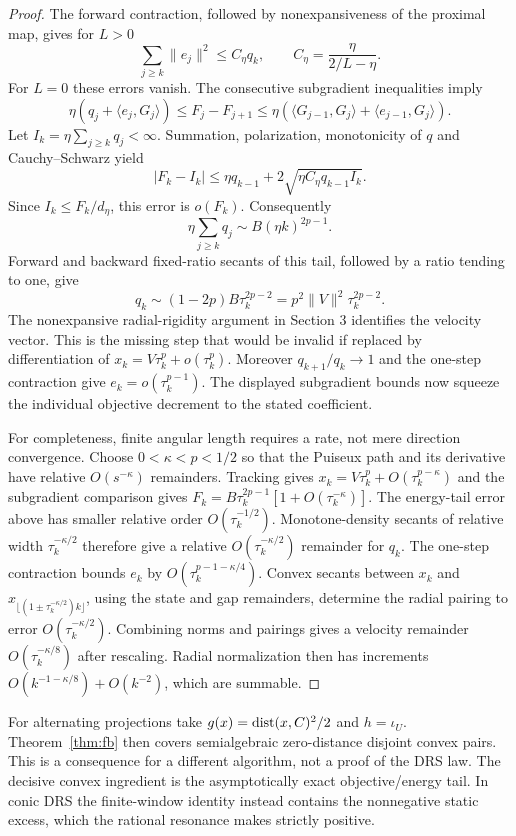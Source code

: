 \documentclass[11pt]{article}
\theoremstyle{remark}\newtheorem{remark}[theorem]{Remark}
\newcommand{\ip}[2]{\langle #1,#2\rangle}\newcommand{\norm}[1]{\lVert #1\rVert}
\numberwithin{equation}{section}
\begin{document}
\begin{proof}
The forward contraction, followed by nonexpansiveness of the proximal map, gives for $L>0$
\[
 \sum_{j\geq k}\norm{e_j}^2\leq C_\eta q_k,
 \qquad C_\eta=\frac{\eta}{2/L-\eta}.
\]
For $L=0$ these errors vanish. The consecutive subgradient inequalities imply
\[
 \eta(q_j+\ip{e_j}{G_j})\leq F_j-F_{j+1}
 \leq\eta(\ip{G_{j-1}}{G_j}+\ip{e_{j-1}}{G_j}).
\]
Let $I_k=\eta\sum_{j\geq k}q_j<\infty$. Summation, polarization, monotonicity of $q$ and Cauchy--Schwarz yield
\[
 |F_k-I_k|\leq\eta q_{k-1}+2\sqrt{\eta C_\eta q_{k-1}I_k}.
\]
Since $I_k\leq F_k/d_\eta$, this error is $o(F_k)$. Consequently
\[
 \eta\sum_{j\geq k}q_j\sim B(\eta k)^{2p-1}.
\]
Forward and backward fixed-ratio secants of this tail, followed by a ratio tending to one, give
\[
 q_k\sim (1-2p)B\tau_k^{2p-2}=p^2\norm V^2\tau_k^{2p-2}.
\]
The nonexpansive radial-rigidity argument in Section 3 identifies the velocity vector. This is the missing step that would be invalid if replaced by differentiation of $x_k=V\tau_k^p+o(\tau_k^p)$. Moreover $q_{k+1}/q_k\to1$ and the one-step contraction give $e_k=o(\tau_k^{p-1})$. The displayed subgradient bounds now squeeze the individual objective decrement to the stated coefficient.

For completeness, finite angular length requires a rate, not mere direction convergence. Choose $0<\kappa<p<1/2$ so that the Puiseux path and its derivative have relative $O(s^{-\kappa})$ remainders. Tracking gives $x_k=V\tau_k^p+O(\tau_k^{p-\kappa})$ and the subgradient comparison gives $F_k=B\tau_k^{2p-1}[1+O(\tau_k^{-\kappa})]$. The energy-tail error above has smaller relative order $O(\tau_k^{-1/2})$. Monotone-density secants of relative width $\tau_k^{-\kappa/2}$ therefore give a relative $O(\tau_k^{-\kappa/2})$ remainder for $q_k$. The one-step contraction bounds $e_k$ by $O(\tau_k^{p-1-\kappa/4})$. Convex secants between $x_k$ and $x_{\lfloor(1\pm\tau_k^{-\kappa/2})k\rfloor}$, using the state and gap remainders, determine the radial pairing to error $O(\tau_k^{-\kappa/2})$. Combining norms and pairings gives a velocity remainder $O(\tau_k^{-\kappa/8})$ after rescaling. Radial normalization then has increments $O(k^{-1-\kappa/8})+O(k^{-2})$, which are summable.
\end{proof}

For alternating projections take $g(x)=\operatorname{dist}(x,C)^2/2$ and $h=\iota_U$. Theorem~\ref{thm:fb} then covers semialgebraic zero-distance disjoint convex pairs. This is a consequence for a different algorithm, not a proof of the DRS law. The decisive convex ingredient is the asymptotically exact objective/energy tail. In conic DRS the finite-window identity instead contains the nonnegative static excess, which the rational resonance makes strictly positive.
\end{document}

